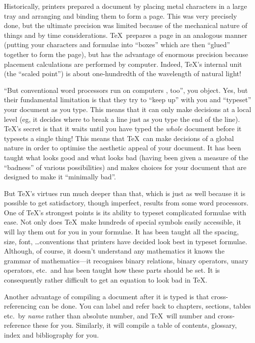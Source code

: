 Historically, printers prepared a document by placing metal
characters in a large tray and arranging and binding them
to form a page.  This was very precisely done, but the ultimate
precision was limited because of the mechanical nature of
things and by time considerations.  \TeX\ prepares a page
in an analogous manner (putting your characters and
formulae into ``boxes'' which are then ``glued'' together
to form the page), but has the advantage of enormous
precision because placement calculations are performed
by computer.  Indeed, \TeX's internal unit (the ``scaled
point'') is about one-hundredth of the wavelength of
natural light!

``But conventional word processors run on computers , too'',
you object.  Yes, but their fundamental limitation is that
they try to ``keep up'' with you and ``typeset'' your document
as you type.  This means that it can only make decisions at
a local level (eg, it decides where to break a line just as you
type the end of the line).  \TeX's secret is that it waits until
you have typed the {\em whole\/} document before it typesets
a single thing!  This means that \TeX\ can make decisions of
a global nature in order to optimise the aesthetic appeal of
your document.  It has been taught what looks good and what
looks bad (having been given a measure of the ``badness'' of
various possibilities) and makes choices for your document that
are designed to make it ``minimally bad''.

But \TeX's virtues run much deeper than that, which is just as well
because it is possible to get satisfactory, though imperfect, results from
some word processors.  One of \TeX's strongest points is its ability
to typeset complicated formulae with ease.  Not only does \TeX\
make hundreds of special symbols easily accessible, it will lay them
out for you in your formulae.  It has been taught all the spacing,
size, font, \ldots conventions that printers have decided look
best in typeset formulae.  Although, of course, it doesn't understand
any mathematics it knows the grammar of mathematics---it
recognises binary relations, binary operators, unary operators, etc.\
and has been taught how these parts should be set.  It is consequently
rather difficult to get an equation to look bad in \TeX.

Another advantage of compiling a document after it is typed is that
cross-referencing can be done.  You can label and refer back to
chapters, sections, tables etc.\ by {\em name\/} rather than absolute
number, and \TeX\ will number and cross-reference these for you.
Similarly, it will compile a table of contents, glossary, index and bibliography
for you.

